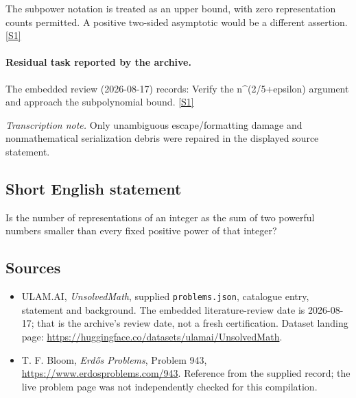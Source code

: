 \documentclass[11pt,a4paper]{article}
\newcommand{\sref}[2]{\hyperlink{source:#1:#2}{[S#2]}}
\begin{document}
The subpower notation is treated as an upper bound, with zero representation counts permitted. A positive two-sided asymptotic would be a different assertion. \sref{statement}{1}

\paragraph{Residual task reported by the archive.}

The embedded review (2026-08-17) records: Verify the n\textasciicircum{}(2/5+epsilon) argument and approach the subpolynomial bound. \sref{statement}{1}

{\small\emph{Transcription note.} Only unambiguous escape/formatting damage and nonmathematical serialization debris were repaired in the displayed source statement.}

\subsection{Short English statement}

Is the number of representations of an integer as the sum of two powerful numbers smaller than every fixed positive power of that integer?

\subsection{Sources}

{\small

\begin{itemize}

\item[\hypertarget{source:statement:1}{S1}] ULAM.AI, \emph{UnsolvedMath}, supplied \texttt{problems.json}, catalogue entry, statement and background. The embedded literature-review date is 2026-08-17; that is the archive’s review date, not a fresh certification. Dataset landing page: \url{https://huggingface.co/datasets/ulamai/UnsolvedMath}.

\item[\hypertarget{source:statement:2}{S2}] T. F. Bloom, \emph{Erdős Problems}, Problem 943, \url{https://www.erdosproblems.com/943}. Reference from the supplied record; the live problem page was not independently checked for this compilation.

\end{itemize}

}

\label{end:statement}
\end{document}
